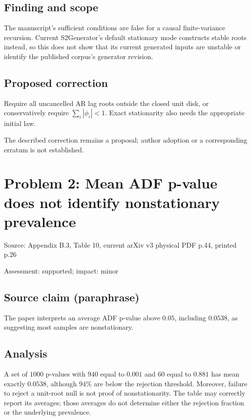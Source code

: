 \documentclass[11pt]{article}
\begin{document}
\subsection*{Finding and scope}

The manuscript’s sufficient conditions are false for a causal finite-variance recursion. Current S2Generator’s default stationary mode constructs stable roots instead, so this does not show that its current generated inputs are unstable or identify the published corpus’s generator revision.

\subsection*{Proposed correction}

Require all uncancelled AR lag roots outside the closed unit disk, or conservatively require \(\sum_i|\phi_i|<1\). Exact stationarity also needs the appropriate initial law.

The described correction remains a proposal; author adoption or a corresponding erratum is not established.

\section*{Problem 2: Mean ADF p-value does not identify nonstationary prevalence}

Source: Appendix B.3, Table 10, current arXiv v3 physical PDF p.44, printed p.26

Assessment: supported; impact: minor

\subsection*{Source claim (paraphrase)}

The paper interprets an average ADF p-value above \(0.05\), including \(0.0538\), as suggesting most samples are nonstationary.

\subsection*{Analysis}

A set of \(1000\) p-values with \(940\) equal to \(0.001\) and \(60\) equal to \(0.881\) has mean exactly \(0.0538\), although \(94\%\) are below the rejection threshold. Moreover, failure to reject a unit-root null is not proof of nonstationarity. The table may correctly report its averages; those averages do not determine either the rejection fraction or the underlying prevalence.
\end{document}
